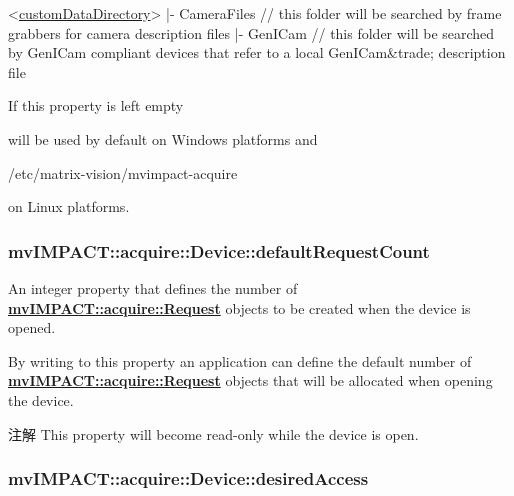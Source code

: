 \begin{DoxyCode}
<\hyperlink{classmv_i_m_p_a_c_t_1_1acquire_1_1_device_a356137fa9ec71b56e7981276aaf3c4f2}{customDataDirectory}>
    |- CameraFiles  \textcolor{comment}{// this folder will be searched by frame grabbers for camera description files}
    |- GenICam      \textcolor{comment}{// this folder will be searched by GenICam compliant devices that refer to a local
       GenICam&trade; description file}
\end{DoxyCode}


If this property is left empty 
\begin{DoxyCode}
\end{DoxyCode}
 will be used by default on Windows\texttrademark{} platforms and 
\begin{DoxyCode}
/etc/matrix-vision/mvimpact-acquire
\end{DoxyCode}
 on Linux platforms. \hypertarget{classmv_i_m_p_a_c_t_1_1acquire_1_1_device_a703ef11aee37b938415a85c9f9256222}{
\subsubsection[{default\+Request\+Count}]{ mv\+I\+M\+P\+A\+C\+T\+::acquire\+::\+Device\+::default\+Request\+Count}}\label{classmv_i_m_p_a_c_t_1_1acquire_1_1_device_a703ef11aee37b938415a85c9f9256222}


An integer property that defines the number of {\bfseries \hyperlink{classmv_i_m_p_a_c_t_1_1acquire_1_1_request}{mv\+I\+M\+P\+A\+C\+T\+::acquire\+::\+Request}} objects to be created when the device is opened. 

By writing to this property an application can define the default number of {\bfseries \hyperlink{classmv_i_m_p_a_c_t_1_1acquire_1_1_request}{mv\+I\+M\+P\+A\+C\+T\+::acquire\+::\+Request}} objects that will be allocated when opening the device.

\begin{DoxyNote}{注解}
This property will become read-\/only while the device is open. 
\end{DoxyNote}
\hypertarget{classmv_i_m_p_a_c_t_1_1acquire_1_1_device_a26e3ec1dd3b45767268946aebfbc3250}{
\subsubsection[{desired\+Access}]{ mv\+I\+M\+P\+A\+C\+T\+::acquire\+::\+Device\+::desired\+Access}}\label{classmv_i_m_p_a_c_t_1_1acquire_1_1_device_a26e3ec1dd3b45767268946aebfbc3250}


